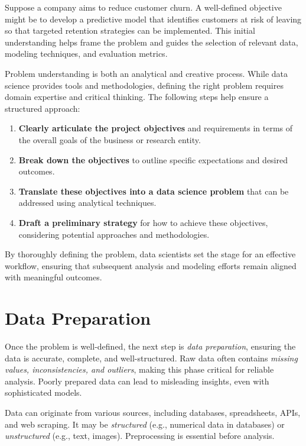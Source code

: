 \documentclass[
]{book}
\providecommand{\tightlist}{%
  \setlength{\itemsep}{0pt}\setlength{\parskip}{0pt}}
\theoremstyle{definition}
\theoremstyle{definition}
\theoremstyle{definition}
\theoremstyle{definition}
\theoremstyle{remark}
\begin{document}
Suppose a company aims to reduce customer churn. A well-defined objective might be to develop a predictive model that identifies customers at risk of leaving so that targeted retention strategies can be implemented. This initial understanding helps frame the problem and guides the selection of relevant data, modeling techniques, and evaluation metrics.

Problem understanding is both an analytical and creative process. While data science provides tools and methodologies, defining the right problem requires domain expertise and critical thinking. The following steps help ensure a structured approach:

\begin{enumerate}
\def\labelenumi{\arabic{enumi}.}
\tightlist
\item
  \textbf{Clearly articulate the project objectives} and requirements in terms of the overall goals of the business or research entity.
\item
  \textbf{Break down the objectives} to outline specific expectations and desired outcomes.
\item
  \textbf{Translate these objectives into a data science problem} that can be addressed using analytical techniques.
\item
  \textbf{Draft a preliminary strategy} for how to achieve these objectives, considering potential approaches and methodologies.
\end{enumerate}

By thoroughly defining the problem, data scientists set the stage for an effective workflow, ensuring that subsequent analysis and modeling efforts remain aligned with meaningful outcomes.

\section{Data Preparation}\label{data-preparation}

Once the problem is well-defined, the next step is \emph{data preparation}, ensuring the data is accurate, complete, and well-structured. Raw data often contains \emph{missing values, inconsistencies, and outliers}, making this phase critical for reliable analysis. Poorly prepared data can lead to misleading insights, even with sophisticated models.

Data can originate from various sources, including databases, spreadsheets, APIs, and web scraping. It may be \emph{structured} (e.g., numerical data in databases) or \emph{unstructured} (e.g., text, images). Preprocessing is essential before analysis.
\end{document}
